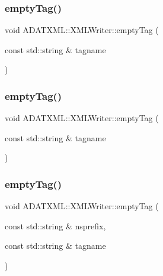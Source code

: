 \subsubsection{\texorpdfstring{emptyTag()}{emptyTag()}\hspace{0.1cm}{\footnotesize\ttfamily [2/12]}}
{\footnotesize\ttfamily void A\+D\+A\+T\+X\+M\+L\+::\+X\+M\+L\+Writer\+::empty\+Tag (\begin{DoxyParamCaption}\item[{const std\+::string \&}]{tagname }\end{DoxyParamCaption})}

\mbox{\label{classADATXML_1_1XMLWriter_a7749a56b9e15992d3168f808b2ad02c5}} 
\subsubsection{\texorpdfstring{emptyTag()}{emptyTag()}\hspace{0.1cm}{\footnotesize\ttfamily [3/12]}}
{\footnotesize\ttfamily void A\+D\+A\+T\+X\+M\+L\+::\+X\+M\+L\+Writer\+::empty\+Tag (\begin{DoxyParamCaption}\item[{const std\+::string \&}]{tagname }\end{DoxyParamCaption})}

\mbox{\label{classADATXML_1_1XMLWriter_a7941500f8d733594745588b65ff4789c}} 
\subsubsection{\texorpdfstring{emptyTag()}{emptyTag()}\hspace{0.1cm}{\footnotesize\ttfamily [4/12]}}
{\footnotesize\ttfamily void A\+D\+A\+T\+X\+M\+L\+::\+X\+M\+L\+Writer\+::empty\+Tag (\begin{DoxyParamCaption}\item[{const std\+::string \&}]{nsprefix,  }\item[{const std\+::string \&}]{tagname }\end{DoxyParamCaption})}

\mbox{\label{classADATXML_1_1XMLWriter_a7941500f8d733594745588b65ff4789c}} 
